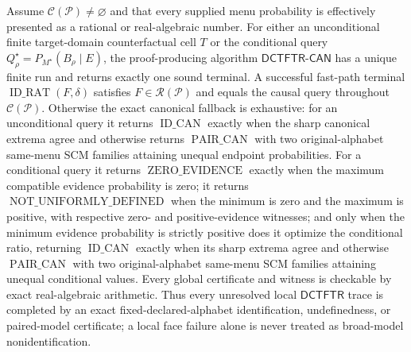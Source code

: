 Assume \(\mathcal C(\mathcal P)\ne\varnothing\) and that every supplied menu probability is effectively presented as a rational or real-algebraic number.  For either an unconditional finite target-domain counterfactual cell \(T\) or the conditional query \(Q_\rho^\star=P_{M^\star}(B_\rho\mid E)\), the proof-producing algorithm \(\mathsf{DCTFTR\text{-}CAN}\) has a unique finite run and returns exactly one sound terminal.  A successful fast-path terminal \(\operatorname{ID\_RAT}(F,\delta)\) satisfies \(F\in\mathscr R(\mathcal P)\) and equals the causal query throughout \(\mathcal C(\mathcal P)\).  Otherwise the exact canonical fallback is exhaustive: for an unconditional query it returns \(\operatorname{ID\_CAN}\) exactly when the sharp canonical extrema agree and otherwise returns \(\operatorname{PAIR\_CAN}\) with two original-alphabet same-menu SCM families attaining unequal endpoint probabilities.  For a conditional query it returns \(\operatorname{ZERO\_EVIDENCE}\) exactly when the maximum compatible evidence probability is zero; it returns \(\operatorname{NOT\_UNIFORMLY\_DEFINED}\) when the minimum is zero and the maximum is positive, with respective zero- and positive-evidence witnesses; and only when the minimum evidence probability is strictly positive does it optimize the conditional ratio, returning \(\operatorname{ID\_CAN}\) exactly when its sharp extrema agree and otherwise \(\operatorname{PAIR\_CAN}\) with two original-alphabet same-menu SCM families attaining unequal conditional values.  Every global certificate and witness is checkable by exact real-algebraic arithmetic.  Thus every unresolved local \(\mathsf{DCTFTR}\) trace is completed by an exact fixed-declared-alphabet identification, undefinedness, or paired-model certificate; a local face failure alone is never treated as broad-model nonidentification.